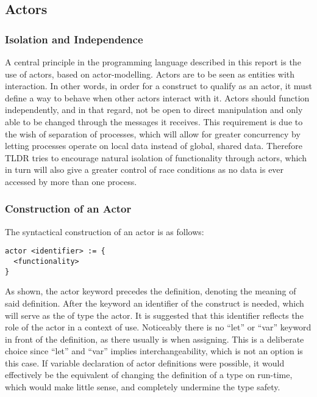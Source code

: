 \subsection{Actors}


\subsubsection{Isolation and Independence}

A central principle in the programming language described in this report is the use of actors, based on actor-modelling. Actors are to be seen as entities with interaction. In other words, in order for a construct to qualify as an actor, it must define a way to behave when other actors interact with it. Actors should function independently, and in that regard, not be open to direct manipulation and only able to be changed through the messages it receives. This requirement is due to the wish of separation of processes, which will allow for greater concurrency by letting processes operate on local data instead of global, shared data. Therefore TLDR tries to encourage natural isolation of functionality through actors, which in turn will also give a greater control of race conditions as no data is ever accessed by more than one process.

\subsubsection{Construction of an Actor}
\label{sub:constructionOfAnActor}

The syntactical construction of an actor is as follows:

\begin{lstlisting}
actor <identifier> := {
  <functionality>
}
\end{lstlisting}

As shown, the actor keyword precedes the definition, denoting the meaning of said definition. After the keyword an identifier of the construct is needed, which will serve as the of type the actor. It is suggested that this identifier reflects the role of the actor in a context of use. Noticeably there is no \enquote{let} or \enquote{var} keyword in front of the definition, as there usually is when assigning. This is a deliberate choice since \enquote{let} and \enquote{var} implies interchangeability, which is not an option is this case. If variable declaration of actor definitions were possible, it would effectively be the equivalent of changing the definition of a type on run-time, which would make little sense, and completely undermine the type safety.


